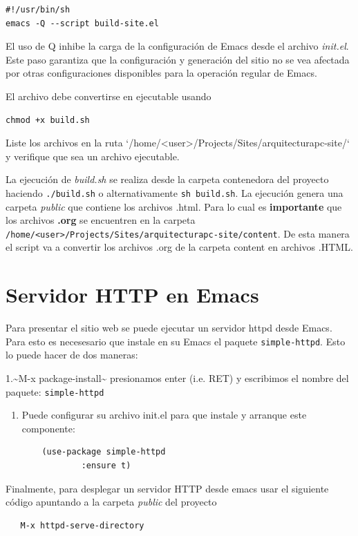 \documentclass{article}
\begin{document}
\begin{verbatim}
#!/usr/bin/sh
emacs -Q --script build-site.el
\end{verbatim}

El uso de Q inhibe la carga de la configuración de Emacs desde el
archivo \emph{init.el}. Este paso garantiza que la configuración y
generación del sitio no se vea afectada por otras configuraciones
disponibles para la operación regular de Emacs.

El archivo debe convertirse en ejecutable usando

\begin{verbatim}
chmod +x build.sh
\end{verbatim}

Liste los archivos en la ruta
`/home/<user>/Projects/Sites/arquitecturapc-site/` y verifique que sea
un archivo ejecutable.

La ejecución de \emph{build.sh} se realiza desde la carpeta contenedora del
proyecto haciendo \texttt{./build.sh} o alternativamente \texttt{sh build.sh}. La
ejecución genera una carpeta \emph{public} que contiene los archivos
.html. Para lo cual es \textbf{\textbf{importante}} que los archivos \textbf{\textbf{.org}} se
encuentren en la carpeta
\texttt{/home/<user>/Projects/Sites/arquitecturapc-site/content}. De esta
manera el script va a convertir los archivos .org de la carpeta
content en archivos .HTML.
\section{Servidor HTTP en Emacs}
\label{sec:org58f8da6}
Para presentar el sitio web se puede ejecutar un servidor httpd desde
Emacs. Para esto es necesesario que instale en su Emacs el paquete
\texttt{simple-httpd}. Esto lo puede hacer de dos maneras:

1.\textasciitilde{}M-x package-install\textasciitilde{} presionamos enter (i.e. RET) y escribimos el
nombre del paquete: \texttt{simple-httpd}
\begin{enumerate}
\item Puede configurar su archivo init.el para que instale y arranque este componente:
\begin{verbatim}
    (use-package simple-httpd
            :ensure t)
\end{verbatim}
\end{enumerate}

Finalmente, para desplegar un servidor HTTP desde emacs usar el
siguiente código apuntando a la carpeta \emph{public} del proyecto

\begin{verbatim}
   M-x httpd-serve-directory
\end{verbatim}
\end{document}
